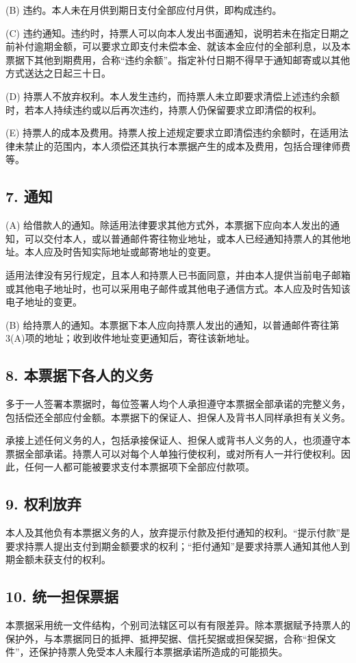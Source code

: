 \documentclass[UTF8,fontset=none,11pt,a4paper]{ctexart}
\begin{document}
(B) 违约。本人未在月供到期日支付全部应付月供，即构成违约。


(C) 违约通知。违约时，持票人可以向本人发出书面通知，说明若未在指定日期之前补付逾期金额，可以要求立即支付未偿本金、就该本金应付的全部利息，以及本票据下其他到期费用，合称“违约余额”。指定补付日期不得早于通知邮寄或以其他方式送达之日起三十日。


(D) 持票人不放弃权利。本人发生违约，而持票人未立即要求清偿上述违约余额时，若本人持续违约或以后再次违约，持票人仍保留要求立即清偿的权利。


(E) 持票人的成本及费用。持票人按上述规定要求立即清偿违约余额时，在适用法律未禁止的范围内，本人须偿还其执行本票据产生的成本及费用，包括合理律师费等。


\subsection*{7. 通知}
(A) 给借款人的通知。除适用法律要求其他方式外，本票据下应向本人发出的通知，可以交付本人，或以普通邮件寄往物业地址，或本人已经通知持票人的其他地址。本人应及时告知实际地址或邮寄地址的变更。


适用法律没有另行规定，且本人和持票人已书面同意，并由本人提供当前电子邮箱或其他电子地址时，也可以采用电子邮件或其他电子通信方式。本人应及时告知该电子地址的变更。


(B) 给持票人的通知。本票据下本人应向持票人发出的通知，以普通邮件寄往第3(A)项的地址；收到收件地址变更通知后，寄往该新地址。


\subsection*{8. 本票据下各人的义务}
多于一人签署本票据时，每位签署人均个人承担遵守本票据全部承诺的完整义务，包括偿还全部应付金额。本票据下的保证人、担保人及背书人同样承担有关义务。


承接上述任何义务的人，包括承接保证人、担保人或背书人义务的人，也须遵守本票据全部承诺。持票人可以对每个人单独行使权利，或对所有人一并行使权利。因此，任何一人都可能被要求支付本票据项下全部应付款项。


\subsection*{9. 权利放弃}
本人及其他负有本票据义务的人，放弃提示付款及拒付通知的权利。“提示付款”是要求持票人提出支付到期金额要求的权利；“拒付通知”是要求持票人通知其他人到期金额未获支付的权利。


\subsection*{10. 统一担保票据}
本票据采用统一文件结构，个别司法辖区可以有有限差异。除本票据赋予持票人的保护外，与本票据同日的抵押、抵押契据、信托契据或担保契据，合称“担保文件”，还保护持票人免受本人未履行本票据承诺所造成的可能损失。
\end{document}
